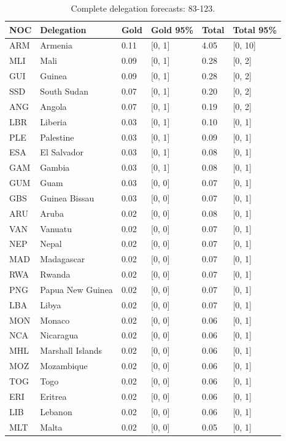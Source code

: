 \documentclass[11pt,a4paper]{article}
\begin{document}
{\small\begin{longtable}{@{}L{1.098cm} L{4.464cm} R{1.463cm} R{2.195cm} R{1.610cm} R{2.342cm}@{}}
\caption{Complete delegation forecasts: 83-123.}\label{tab:10}\\
\toprule
NOC & Delegation & Gold & Gold 95\% & Total & Total 95\%\\
\midrule
\endhead
ARM & Armenia & 0.11 & [0, 1] & 4.05 & [0, 10]\\
MLI & Mali & 0.09 & [0, 1] & 0.28 & [0, 2]\\
GUI & Guinea & 0.09 & [0, 1] & 0.28 & [0, 2]\\
SSD & South Sudan & 0.07 & [0, 1] & 0.20 & [0, 2]\\
ANG & Angola & 0.07 & [0, 1] & 0.19 & [0, 2]\\
LBR & Liberia & 0.03 & [0, 1] & 0.10 & [0, 1]\\
PLE & Palestine & 0.03 & [0, 1] & 0.09 & [0, 1]\\
ESA & El Salvador & 0.03 & [0, 1] & 0.08 & [0, 1]\\
GAM & Gambia & 0.03 & [0, 1] & 0.08 & [0, 1]\\
GUM & Guam & 0.03 & [0, 0] & 0.07 & [0, 1]\\
GBS & Guinea Bissau & 0.03 & [0, 0] & 0.07 & [0, 1]\\
ARU & Aruba & 0.02 & [0, 0] & 0.08 & [0, 1]\\
VAN & Vanuatu & 0.02 & [0, 0] & 0.07 & [0, 1]\\
NEP & Nepal & 0.02 & [0, 0] & 0.07 & [0, 1]\\
MAD & Madagascar & 0.02 & [0, 0] & 0.07 & [0, 1]\\
RWA & Rwanda & 0.02 & [0, 0] & 0.07 & [0, 1]\\
PNG & Papua New Guinea & 0.02 & [0, 0] & 0.07 & [0, 1]\\
LBA & Libya & 0.02 & [0, 0] & 0.07 & [0, 1]\\
MON & Monaco & 0.02 & [0, 0] & 0.06 & [0, 1]\\
NCA & Nicaragua & 0.02 & [0, 0] & 0.06 & [0, 1]\\
MHL & Marshall Islands & 0.02 & [0, 0] & 0.06 & [0, 1]\\
MOZ & Mozambique & 0.02 & [0, 0] & 0.06 & [0, 1]\\
TOG & Togo & 0.02 & [0, 0] & 0.06 & [0, 1]\\
ERI & Eritrea & 0.02 & [0, 0] & 0.06 & [0, 1]\\
LIB & Lebanon & 0.02 & [0, 0] & 0.06 & [0, 1]\\
MLT & Malta & 0.02 & [0, 0] & 0.05 & [0, 1]\\

\end{longtable}}
\end{document}
